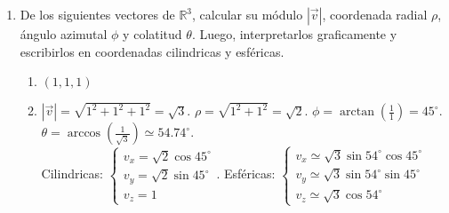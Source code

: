 \documentclass[a4paper]{article}
\newcommand{\answer}{\item[**]}
\newcommand{\exercise}{\item}
\newcommand{\SEL}[1]{ \left\{\begin{matrix} #1 \end{matrix}\right. }
\newcommand{\df}[2]{\displaystyle\frac{#1}{#2}}
\newcommand{\degs}{^{\circ}}
\begin{document}
\begin{enumerate}
\begin{multicols}{2}
\begin{enumerate} [label=(\alph*)]
		\item $\left|\vec{w}\right|=3$ y $\theta=145\degs$
		\answer $\vec{w}=(3 \cos{145\degs}, 3 \sin{145\degs})= \left(-\df{3\sqrt{2}}{2}, \df{3\sqrt{2}}{2}\right)$

		\item $\left|\vec{F}\right|=1$ y $\theta=210\degs$
		\answer $\vec{F}=(\cos{210\degs}, \sin{210\degs})= \left(-\df{\sqrt{3}}{2}, -\df{1}{2}\right)$

		\item $\left|\vec{T}\right|=2$ y $\theta=0\degs$
		\answer $\vec{T}=(2 \cos{0\degs}, 2 \sin{0\degs})= (2,0)$
		
		\item $\left|\vec{L}\right|=6$ y $\theta=330\degs$
		\answer $\vec{L}=(6 \cos{330\degs}, 6 \sin{330\degs})= \left(\df{3\sqrt{3}}{2}, -\df{3}{2}\right)$

		\item $\left|\vec{a}\right|=5$ y $\theta=-45\degs$
		\answer $\vec{a}=(5 \cos{-45\degs}, 5 \sin{-45\degs})= \left(\df{5\sqrt{2}}{2}, -\df{5\sqrt{2}}{2}\right)$

		\item $\left|\vec{n}\right|=0$
		\answer $\vec{n}=(0, 0)$

	\end{enumerate}
	\end{multicols}

	\exercise De los siguientes vectores de $\mathbb{R}^3$, calcular su módulo $|\vec{v}|$, coordenada radial $\rho$, ángulo azimutal $\phi$ y colatitud $\theta$. Luego, interpretarlos graficamente y escribirlos en coordenadas cilindricas y esféricas.
	\begin{multicols}{2}
	\begin{enumerate} [label=(\alph*)]
		
		\item $(1,1,1)$
		\answer $|\vec{v}| = \sqrt{1^2+1^2+1^2} = \sqrt{3}$. $\rho = \sqrt{1^2+1^2} = \sqrt{2}$. $\phi = \arctan\left(\df{1}{1}\right) = 45\degs$. $\theta = \arccos\left(\df{1}{\sqrt{3}}\right) \simeq 54.74\degs$. \\ Cilindricas: $\SEL{v_x=\sqrt{2} \cos{45\degs} \\ v_y=\sqrt{2} \sin{45\degs} \\ v_z=1 }$. Esféricas: $\SEL{v_x \simeq \sqrt{3} \sin{54\degs} \cos{45\degs} \\ v_y \simeq \sqrt{3} \sin{54\degs} \sin{45\degs} \\ v_z \simeq \sqrt{3} \cos{54\degs} }$ 


\end{enumerate}
\end{multicols}
\end{enumerate}
\end{document}
